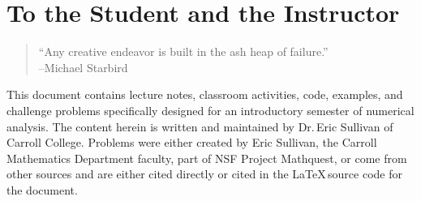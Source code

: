 \setcounter{chapter}{-1}
\chapter{To the Student and the Instructor}
\begin{quote}
    ``Any creative endeavor is built in the ash heap of failure.'' \\ --Michael Starbird
\end{quote}

This document contains lecture notes, classroom activities, code, examples, and challenge
problems specifically designed for an introductory semester of numerical analysis.  The content
herein is written and maintained by Dr.\,Eric Sullivan of Carroll College.  Problems were
either created by Eric Sullivan, the Carroll Mathematics Department faculty, part of NSF
Project Mathquest, or come from other sources and are either cited directly or cited in
the \LaTeX\,source code for the document.  


